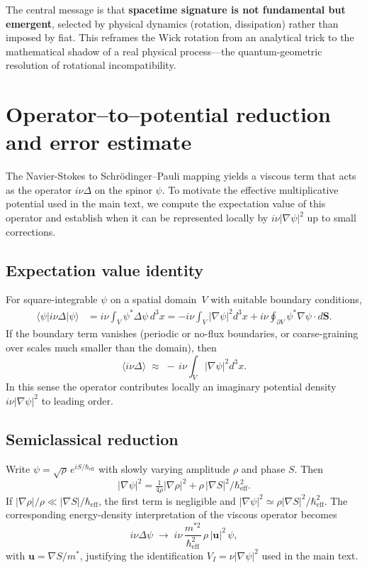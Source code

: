 \documentclass[11pt]{article}
\begin{document}
The central message is that \textbf{spacetime signature is not fundamental but 
emergent}, selected by physical dynamics (rotation, dissipation) rather than imposed 
by fiat. This reframes the Wick rotation from an analytical trick to the mathematical 
shadow of a real physical process---the quantum-geometric resolution of rotational 
incompatibility.




\appendix
\section{Operator--to--potential reduction and error estimate}
\label{app:operator-to-potential}

The Navier-Stokes to Schr\"odinger--Pauli mapping yields a viscous term that acts as the operator $i\nu\Delta$ on the spinor $\psi$.
To motivate the effective multiplicative potential used in the main text, we compute the expectation value of this operator and establish when it can be represented locally by $i\nu|\nabla\psi|^2$ up to small corrections.

\subsection*{Expectation value identity}
For square-integrable $\psi$ on a spatial domain~$V$ with suitable boundary conditions,
\begin{align}
    \langle \psi | i\nu\Delta | \psi\rangle
    &= i\nu \!\int_V \psi^* \Delta \psi \, d^3x
       = -i\nu \!\int_V |\nabla\psi|^2 d^3x
       + i\nu \!\oint_{\partial V} \psi^* \nabla\psi\!\cdot\! d\mathbf S .
\end{align}
If the boundary term vanishes (periodic or no-flux boundaries, or coarse-graining over scales much smaller than the domain), then
\begin{equation}
    \langle i\nu\Delta \rangle \;\approx\; -\,i\nu \!\int_V |\nabla\psi|^2 d^3x .
\end{equation}
In this sense the operator contributes locally an imaginary potential density $i\nu|\nabla\psi|^2$ to leading order.

\subsection*{Semiclassical reduction}
Write $\psi=\sqrt{\rho}\,e^{iS/\hbar_{\mathrm{eff}}}$ with slowly varying amplitude $\rho$ and phase $S$.
Then
\[
|\nabla\psi|^2
= \tfrac{1}{4\rho}|\nabla\rho|^2
+ \rho\,|\nabla S|^2/\hbar_{\mathrm{eff}}^2 .
\]
If $|\nabla\rho|/\rho\ll|\nabla S|/\hbar_{\mathrm{eff}}$, the first term is negligible and
$|\nabla\psi|^2\simeq \rho|\nabla S|^2/\hbar_{\mathrm{eff}}^2$.
The corresponding energy-density interpretation of the viscous operator becomes
\begin{equation}
    i\nu\Delta\psi \;\longrightarrow\; i\nu\,\frac{m^{*2}}{\hbar_{\mathrm{eff}}^2}\,\rho\,|\mathbf u|^2\,\psi ,
\end{equation}
with $\mathbf u=\nabla S/m^*$, justifying the identification $V_I=\nu|\nabla\psi|^2$ used in the main text.
\end{document}
